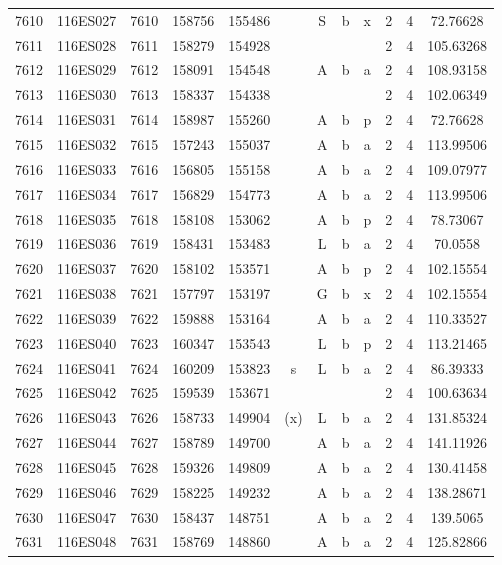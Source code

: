 \begin{tabular}{|*{12}{c|}}
7610 & 116ES027 & 7610 & 158756 & 155486 &  & S & b & x & 2 & 4 & 72.76628 \\ 
7611 & 116ES028 & 7611 & 158279 & 154928 &  &  &  &  & 2 & 4 & 105.63268 \\ 
7612 & 116ES029 & 7612 & 158091 & 154548 &  & A & b & a & 2 & 4 & 108.93158 \\ 
7613 & 116ES030 & 7613 & 158337 & 154338 &  &  &  &  & 2 & 4 & 102.06349 \\ 
7614 & 116ES031 & 7614 & 158987 & 155260 &  & A & b & p & 2 & 4 & 72.76628 \\ 
7615 & 116ES032 & 7615 & 157243 & 155037 &  & A & b & a & 2 & 4 & 113.99506 \\ 
7616 & 116ES033 & 7616 & 156805 & 155158 &  & A & b & a & 2 & 4 & 109.07977 \\ 
7617 & 116ES034 & 7617 & 156829 & 154773 &  & A & b & a & 2 & 4 & 113.99506 \\ 
7618 & 116ES035 & 7618 & 158108 & 153062 &  & A & b & p & 2 & 4 & 78.73067 \\ 
7619 & 116ES036 & 7619 & 158431 & 153483 &  & L & b & a & 2 & 4 & 70.0558 \\ 
7620 & 116ES037 & 7620 & 158102 & 153571 &  & A & b & p & 2 & 4 & 102.15554 \\ 
7621 & 116ES038 & 7621 & 157797 & 153197 &  & G & b & x & 2 & 4 & 102.15554 \\ 
7622 & 116ES039 & 7622 & 159888 & 153164 &  & A & b & a & 2 & 4 & 110.33527 \\ 
7623 & 116ES040 & 7623 & 160347 & 153543 &  & L & b & p & 2 & 4 & 113.21465 \\ 
7624 & 116ES041 & 7624 & 160209 & 153823 & s & L & b & a & 2 & 4 & 86.39333 \\ 
7625 & 116ES042 & 7625 & 159539 & 153671 &  &  &  &  & 2 & 4 & 100.63634 \\ 
7626 & 116ES043 & 7626 & 158733 & 149904 & (x) & L & b & a & 2 & 4 & 131.85324 \\ 
7627 & 116ES044 & 7627 & 158789 & 149700 &  & A & b & a & 2 & 4 & 141.11926 \\ 
7628 & 116ES045 & 7628 & 159326 & 149809 &  & A & b & a & 2 & 4 & 130.41458 \\ 
7629 & 116ES046 & 7629 & 158225 & 149232 &  & A & b & a & 2 & 4 & 138.28671 \\ 
7630 & 116ES047 & 7630 & 158437 & 148751 &  & A & b & a & 2 & 4 & 139.5065 \\ 
7631 & 116ES048 & 7631 & 158769 & 148860 &  & A & b & a & 2 & 4 & 125.82866 \\ 

\end{tabular}
